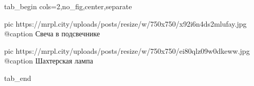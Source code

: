  
 
 
 
 

\ifcmt
  tab_begin cols=2,no_fig,center,separate

     pic https://mrpl.city/uploads/posts/resize/w/750x750/x92i6n4ds2mlufay.jpg
		 @caption Свеча в подсвечнике

		 pic https://mrpl.city/uploads/posts/resize/w/750x750/ei80qlz09w0dkeww.jpg
		 @caption Шахтерская лампа

  tab_end
\fi
